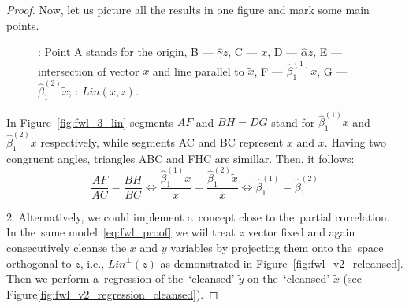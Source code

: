 \begin{proof}
Now, let us picture all the results in one figure and mark some main points.

\begin{figure}[ht!]
\begin{center}
\hspace{4ex}
\caption{: Point A stands for the origin, B — $\hat\gamma z$,
C — $x$, D — $\hat\alpha z$, E — intersection of vector $x$ and line parallel to $\tilde x$,
F — $\hat\beta_1^{(1)} x$, G — $\hat\beta_1^{(2)} \tilde{x}$; : $Lin(x,z)$.}
\end{center}
\end{figure}

In Figure~\ref{fig:fwl_3_lin} segments $AF$ and $BH = DG$ stand for $\hat\beta_1^{(1)}x$
and $\hat\beta_1^{(2)}\tilde x$ respectively, while segments AC and BC represent $x$ and $\tilde{x}$.
Having two congruent angles, triangles ABC and FHC are simillar.
Then, it follows:
\[
\frac{AF}{AC} = \frac{BH}{BC} \Leftrightarrow \frac{\hat\beta_1^{(1)}x}{x} = \frac{\hat\beta_1^{(2)}\tilde x}{\tilde x} \Leftrightarrow \hat\beta_1^{(1)} = \hat\beta_1^{(2)}
\]

2. Alternatively, we could implement a~concept close to the~partial correlation.
In the~same model~\ref{eq:fwl_proof} we wiil treat $z$ vector fixed and again
consecutively cleanse the $x$ and $y$ variables by projecting them onto
the~space orthogonal to $z$, i.e., $Lin^\perp(z)$ as demonstrated in Figure~\ref{fig:fwl_v2_rcleansed}.
Then we perform a~regression of the~`cleansed' $\tilde y$ on the~`cleansed' $\tilde x$
(see Figure\ref{fig:fwl_v2_regression_cleansed}).


\end{proof}
